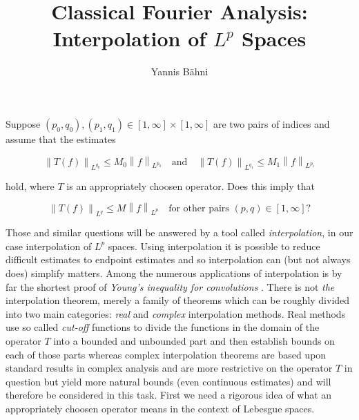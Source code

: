 


\title{Classical Fourier Analysis: Interpolation of $L^p$ Spaces}
\author{Yannis B\"{a}hni}
\address[Yannis B\"{a}hni]{University of Zurich, R\"{a}mistrasse 71, 8006 Zurich}

\maketitle


\addtocounter{section}{1}

Suppose $\left(p_0,q_0\right),\left( p_1,q_1 \right) \in [1,\infty]\times [1,\infty]$ are two pairs of indices and assume that the estimates 

\begin{equation*}
	\left\|T(f)\right\|_{L^{q_0}} \leq M_0\left\|f\right\|_{L^{p_0}} \quad \text{and} \quad \left\|T(f)\right\|_{L^{q_1}} \leq M_1\left\|f\right\|_{L^{p_1}}
\end{equation*}

\noindent hold, where $T$ is an appropriately choosen operator. Does this imply that

\begin{equation*}
	\left\| T(f)\right\|_{L^q} \leq M \left\| f\right\|_{L^p} \quad \text{for other pairs $\left( p,q \right) \in [1,\infty]$?} 
\end{equation*}

Those and similar questions will be answered by a tool called \emph{interpolation}, in our case interpolation of $L^p$ spaces. Using interpolation it is possible to reduce difficult estimates to endpoint estimates and so interpolation can (but not always does) simplify matters. Among the numerous applications of interpolation is by far the shortest proof of \emph{Young's inequality for convolutions} \textup{\cite[22--23]{grafakos:fourier:2014}}. There is not \emph{the} interpolation theorem, merely a family of theorems which can be 
roughly divided into two main categories: \emph{real} and \emph{complex} interpolation methods. Real methods use so called \emph{cut-off} functions to divide the functions in the domain of the operator $T$ into a bounded and unbounded part and then establish bounds on each of those parts whereas complex interpolation theorems are based upon standard results in complex analysis and are more restrictive on the operator $T$ in question but yield more natural bounds (even continuous estimates) and will therefore be considered in this task. First we need a rigorous idea of what an appropriately choosen operator means in the context of Lebesgue spaces.


